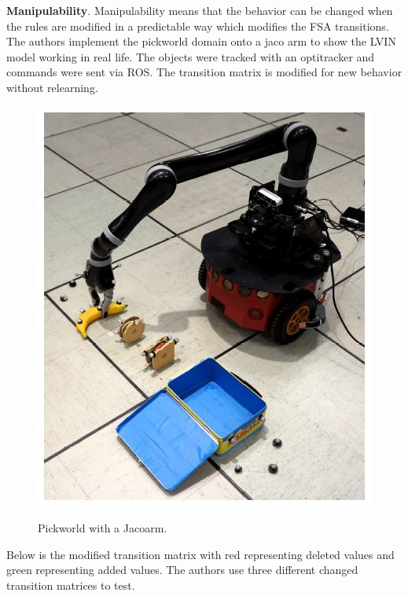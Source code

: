 \documentclass[letterpaper, 10 pt, conference]{ieeeconf}  %
\begin{document}
\textbf{Manipulability}. Manipulability means that the behavior can be changed when the rules are modified in a predictable way which modifies the FSA transitions. The authors implement the pickworld domain onto a jaco arm to show the LVIN model working in real life. The objects were tracked with an optitracker and commands were sent via ROS. The transition matrix is modified for new behavior without relearning. 
\begin{figure}[h]
 \centering
 \includegraphics[scale=.3]{Jacoarm.JPG}\\
 \caption{Pickworld with a Jacoarm.}
\end{figure}
\newpage
Below is the modified transition matrix with red representing deleted values and green representing added values. The authors use three different changed transition matrices to test.
\end{document}
